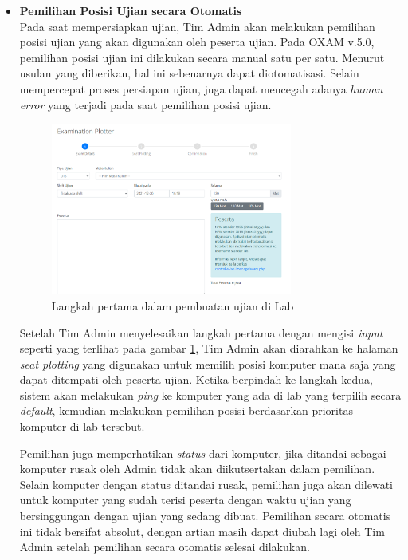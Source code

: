 \documentclass[a4paper,twoside]{article}
\begin{document}
\begin{enumerate}
\begin{itemize}
\begin{itemize}
            		 
            		\item \textbf{Pemilihan Posisi Ujian secara Otomatis}\\
            		\label{pemilihan-otomatis}
            	    Pada saat mempersiapkan ujian, Tim Admin akan melakukan pemilihan posisi ujian yang akan digunakan oleh peserta ujian. Pada OXAM v.5.0, pemilihan posisi ujian ini dilakukan secara manual satu per satu. Menurut usulan yang diberikan, hal ini sebenarnya dapat diotomatisasi. Selain mempercepat proses persiapan ujian, juga dapat mencegah adanya \textit{human error} yang terjadi pada saat pemilihan posisi ujian. 
            	    
                     \begin{figure}[H]
                        \centering
                        \includegraphics[width=0.75\textwidth]{images/create-exam-1.PNG}
                        \caption{Langkah pertama dalam pembuatan ujian di Lab}
                        \label{fig:create-exam-1}
                    \end{figure}
                    
            	    
            	    Setelah Tim Admin menyelesaikan langkah pertama dengan mengisi \textit{input} seperti yang terlihat pada gambar \ref{fig:create-exam-1}, Tim Admin akan diarahkan ke halaman \textit{seat plotting} yang digunakan untuk memilih posisi komputer mana saja yang dapat ditempati oleh peserta ujian. Ketika berpindah ke langkah kedua, sistem akan melakukan \textit{ping} ke komputer yang ada di lab yang terpilih secara \textit{default}, kemudian melakukan pemilihan posisi berdasarkan prioritas komputer di lab tersebut.
            	    
            	    Pemilihan juga memperhatikan \textit{status} dari komputer, jika ditandai sebagai komputer rusak oleh Admin tidak akan diikutsertakan dalam pemilihan. Selain komputer dengan status ditandai rusak, pemilihan juga akan dilewati untuk komputer yang sudah terisi peserta dengan waktu ujian yang bersinggungan dengan ujian yang sedang dibuat. Pemilihan secara otomatis ini tidak bersifat absolut, dengan artian masih dapat diubah lagi oleh Tim Admin setelah pemilihan secara otomatis selesai dilakukan. 
            	   

\end{itemize}
\end{itemize}
\end{enumerate}
\end{document}
